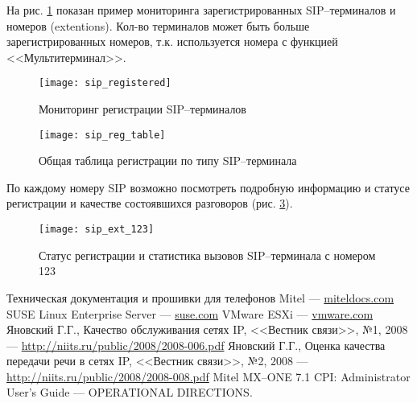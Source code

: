 На рис. \ref{img:sip_reg} показан пример мониторинга зарегистрированных SIP--терминалов и номеров (extentions). Кол-во терминалов может быть больше зарегистрированных номеров, т.к. используется номера с функцией <<Мультитерминал>>.
\begin{figure}[!ht]
  \center
  \texttt{[image: sip\_registered]}
  \caption{Мониторинг регистрации SIP--терминалов}
  \label{img:sip_reg}
\end{figure}

\begin{figure}[!ht]
  \center
  \texttt{[image: sip\_reg\_table]}
  \caption{Общая таблица регистрации по типу SIP--терминала}
  \label{img:sip_reg_table}
\end{figure}

По каждому номеру SIP возможно посмотреть подробную информацию и статусе регистрации и качестве состоявшихся разговоров (рис. \ref{img:sip_ext_123}).
\begin{figure}[!ht]
  \center
  \texttt{[image: sip\_ext\_123]}
  \caption{Статус регистрации и статистика вызовов SIP--терминала с номером 123}
  \label{img:sip_ext_123}
\end{figure}

\begin{thebibliography}{9}
   Техническая документация и прошивки для телефонов Mitel --- \href{http://miteldocs.com}{miteldocs.com}
   SUSE Linux Enterprise Server --- \href{https://www.suse.com/ru-ru/products/server/}{suse.com}
   VMware ESXi --- \href{http://www.vmware.com/products/vsphere-hypervisor/}{vmware.com}
   Яновский Г.Г., Качество обслуживания сетях IP, <<Вестник связи>>, №1, 2008 --- \href{http://niits.ru/public/2008/2008-006.pdf}{http://niits.ru/public/2008/2008-006.pdf}
   Яновский Г.Г., Оценка качества передачи речи в сетях IP, <<Вестник связи>>, №2, 2008 --- \href{http://niits.ru/public/2008/2008-008.pdf}{http://niits.ru/public/2008/2008-008.pdf}
   Mitel MX--ONE 7.1 CPI: Administrator User's Guide --- OPERATIONAL DIRECTIONS.
\end{thebibliography}
